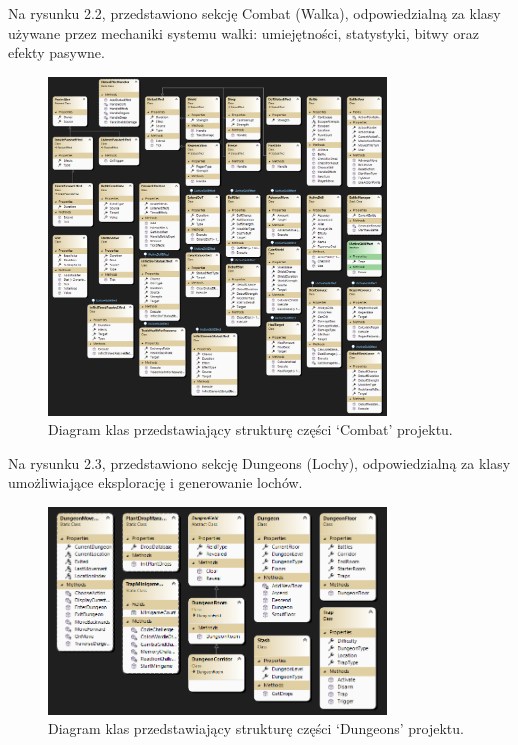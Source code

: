 \begin{itemize}
    \begin{minipage}{\linewidth}%
    \item Na rysunku 2.2, przedstawiono sekcję Combat (Walka), odpowiedzialną za klasy używane przez mechaniki systemu walki: umiejętności, statystyki, bitwy oraz efekty pasywne.
        \begin{figure}[H]
        \centering
        \includegraphics[width=0.8\textwidth]{figures/class_diagram_combat.png}
        \caption{Diagram klas przedstawiający strukturę części `Combat' projektu.}
        \label{fig:class_diagram_combat}
        \end{figure}
    \end{minipage}

    \begin{minipage}{\linewidth}%
    \item Na rysunku 2.3, przedstawiono sekcję Dungeons (Lochy), odpowiedzialną za klasy umożliwiające eksplorację i generowanie lochów.
        \begin{figure}[H]
        \centering
        \includegraphics[width=0.8\textwidth]{figures/class_diagram_dungeons.png}
        \caption{Diagram klas przedstawiający strukturę części `Dungeons' projektu.}
        \label{fig:class_diagram_dungeons}
        \end{figure}
    \end{minipage}
    

\end{itemize}
